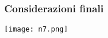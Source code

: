 \begin{frame}
  \frametitle{Considerazioni finali}
  \centering
  \texttt{[image: n7.png]}
\end{frame}


